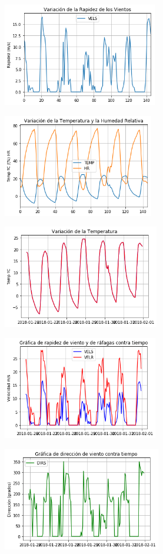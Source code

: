 \documentclass[a4paper]{article}
\begin{document}
\begin{center}

\includegraphics[height=4.5cm]{grafica1.png}

\includegraphics[height=4.5cm]{grafica2.png}

\includegraphics[height=4.5cm]{grafica3.png}

\includegraphics[height=4.5cm]{grafica4.png}

\includegraphics[height=4.5cm]{grafica5.png}


\end{center}
\end{document}
